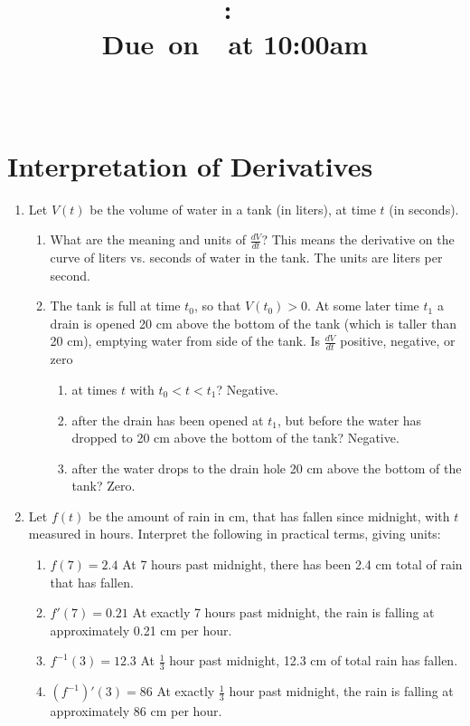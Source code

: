 \documentclass{article}
\title{
    \vspace{2in}
    \textmd{\textbf{\hmwkClass:\ \hmwkTitle}}\\
    \normalsize\vspace{0.1in}\small{Due\ on\ \hmwkDueDate\ at 10:00am}\\
    \vspace{0.1in}\large{\textit{\hmwkClassInstructor\ \hmwkClassTime}}
    \vspace{3in}
}
\author{\hmwkAuthorName}
\date{}
\begin{document}
\maketitle

\pagebreak

\section{Interpretation of Derivatives}

\begin{enumerate}
\setcounter{enumi}{0}
	\item Let $V(t)$ be the volume of water in a tank (in liters), at time $t$ (in seconds).
	\begin{enumerate}
		\item What are the meaning and units of $\frac{dV}{dt}$?\newline
			This means the derivative on the curve of liters vs. seconds of water in the tank. The units are liters per second.
		\item The tank is full at time $t_0$, so that $V(t_0)>0$. At some later time $t_1$ a drain is opened 20 cm above the bottom of the tank (which is taller than 20 cm), emptying water from side of the tank. Is $\frac{dV}{dt}$ positive, negative, or zero
			\begin{enumerate}
				\item at times $t$ with $t_0 < t < t_1$?\newline
					Negative.
				\item after the drain has been opened at $t_1$, but before the water has dropped to 20 cm above the bottom of the tank?\newline
					Negative.
				\item after the water drops to the drain hole 20 cm above the bottom of the tank?\newline
					Zero.
			\end{enumerate}
	\end{enumerate}
	\item Let $f(t)$ be the amount of rain in cm, that has fallen since midnight, with $t$ measured in hours. Interpret the following in practical terms, giving units:
	\begin{enumerate}
		\item $f(7)=2.4$\newline
			At 7 hours past midnight, there has been 2.4 cm total of rain that has fallen.
		\item $f'(7)=0.21$\newline
			At exactly 7 hours past midnight, the rain is falling at approximately 0.21 cm per hour.
		\item $f^{-1}(3)=12.3$\newline
			At $\frac{1}{3}$ hour past midnight, 12.3 cm of total rain has fallen.
		\item $(f^{-1})'(3)=86$\newline
			At exactly $\frac{1}{3}$ hour past midnight, the rain is falling at approximately 86 cm per hour.
	\end{enumerate}
\end{enumerate}
\end{document}
